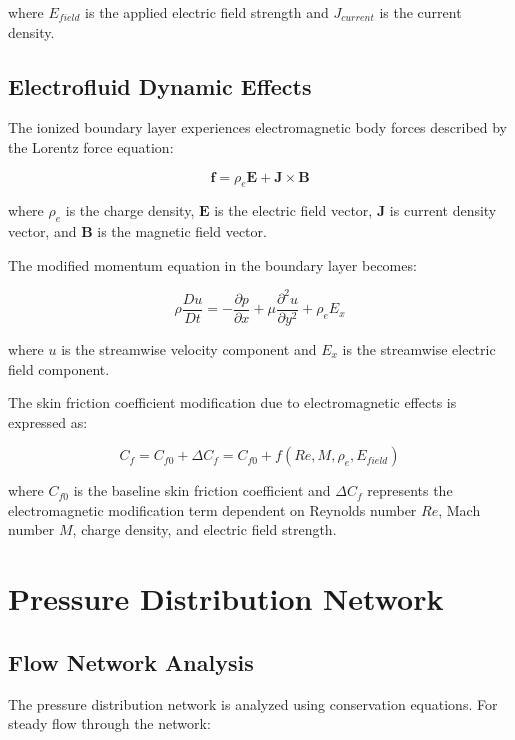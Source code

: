 \documentclass[12pt,a4paper]{article}
\begin{document}
where $E_{field}$ is the applied electric field strength and $J_{current}$ is the current density.

\subsection{Electrofluid Dynamic Effects}

The ionized boundary layer experiences electromagnetic body forces described by the Lorentz force equation:

\begin{equation}
\mathbf{f} = \rho_e \mathbf{E} + \mathbf{J} \times \mathbf{B}
\end{equation}

where $\rho_e$ is the charge density, $\mathbf{E}$ is the electric field vector, $\mathbf{J}$ is current density vector, and $\mathbf{B}$ is the magnetic field vector.

The modified momentum equation in the boundary layer becomes:

\begin{equation}
\rho \frac{Du}{Dt} = -\frac{\partial p}{\partial x} + \mu \frac{\partial^2 u}{\partial y^2} + \rho_e E_x
\end{equation}

where $u$ is the streamwise velocity component and $E_x$ is the streamwise electric field component.

The skin friction coefficient modification due to electromagnetic effects is expressed as:

\begin{equation}
C_f = C_{f0} + \Delta C_f = C_{f0} + f(Re, M, \rho_e, E_{field})
\end{equation}

where $C_{f0}$ is the baseline skin friction coefficient and $\Delta C_f$ represents the electromagnetic modification term dependent on Reynolds number $Re$, Mach number $M$, charge density, and electric field strength.

\section{Pressure Distribution Network}

\subsection{Flow Network Analysis}

The pressure distribution network is analyzed using conservation equations. For steady flow through the network:
\end{document}
